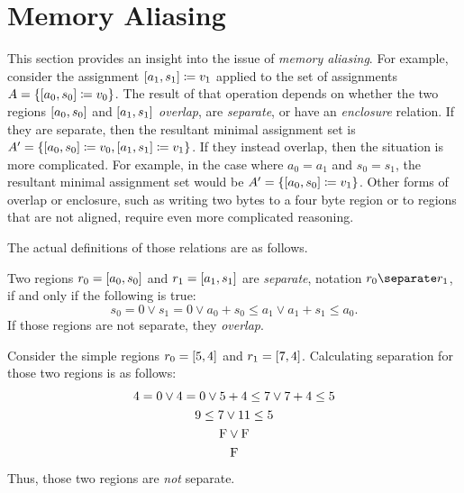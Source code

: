 \section{Memory Aliasing}\label{sse:memory_aliasing}
This section provides an insight into the issue of \emph{memory aliasing}.%
For example, consider the assignment $[a_1,s_1]\coloneqq v_1$
applied to the set of assignments $A=\{[a_0,s_0]\coloneqq v_0\}$.
The result of that operation
depends on whether the two regions $[a_0,s_0]$ and $[a_1,s_1]$
\emph{overlap}, are \emph{separate}, or have an \emph{enclosure} relation.%
%
%
If they are separate, then the resultant minimal assignment set is
$A'=\{[a_0,s_0]\coloneqq v_0,[a_1,s_1]\coloneqq v_1\}$.
If they instead overlap, then the situation is more complicated.
For example, in the case where $a_0=a_1$ and $s_0=s_1$,
the resultant minimal assignment set would be $A'=\{[a_0,s_0]\coloneqq v_1\}$.
Other forms of overlap or enclosure, such as writing two bytes to a four byte region
or to regions that are not aligned, require even more complicated reasoning.

The actual definitions of those relations are as follows.
\begin{definition}[Separation]
  Two regions $r_0=[a_0,s_0]$ and $r_1=[a_1,s_1]$ are \emph{separate},
  notation $r_0\separate r_1$, if and only if the following is true:
  \begin{equation*}
    s_0=0\vee s_1=0\vee a_0+s_0\leq a_1\vee a_1+s_1\leq a_0.
  \end{equation*}
  If those regions are not separate, they \emph{overlap}.
\end{definition}
\begin{example}
  Consider the simple regions $r_0=[5,4]$ and $r_1=[7,4]$.
  Calculating separation for those two regions is as follows:
  \begin{gather*}
    4=0\vee 4=0\vee 5+4\leq 7\vee 7+4\leq 5 \\
    9\leq 7\vee 11\leq 5 \\
    \mathrm{F}\vee\mathrm{F} \\
    \mathrm{F}
  \end{gather*}
  Thus, those two regions are \emph{not} separate.
\end{example}

